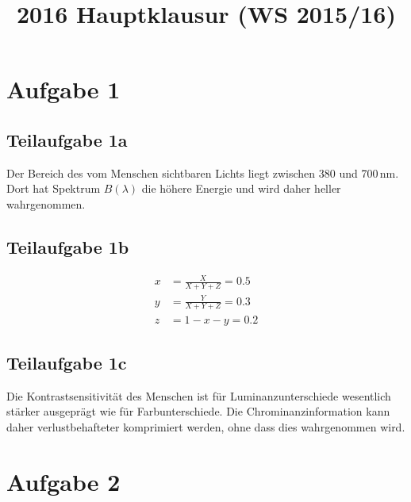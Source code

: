 \documentclass[a4paper]{scrartcl}
\begin{document}
\title{2016 Hauptklausur (WS 2015/16)}

\setcounter{section}{1}
\section*{Aufgabe 1}
\subsection*{Teilaufgabe 1a}
Der Bereich des vom Menschen sichtbaren Lichts liegt zwischen 380 und 700\,nm.
Dort hat Spektrum $B(\lambda)$ die höhere Energie und wird daher heller wahrgenommen.

\subsection*{Teilaufgabe 1b}
\begin{align*}
x &= \frac{X}{X+Y+Z} = 0.5\\
y &= \frac{Y}{X+Y+Z} = 0.3\\
z &= 1 - x - y = 0.2
\end{align*}

\subsection*{Teilaufgabe 1c}
Die Kontrastsensitivität des Menschen ist für Luminanzunterschiede wesentlich stärker ausgeprägt wie für Farbunterschiede.
Die Chrominanzinformation kann daher verlustbehafteter komprimiert werden, ohne dass dies wahrgenommen wird.

\section*{Aufgabe 2}
\end{document}
